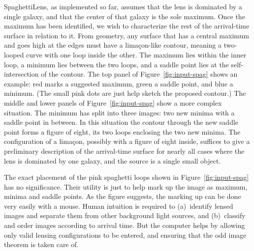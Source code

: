 \documentclass[12pt,preprint]{aastex}
\newcommand{\spl}{SpaghettiLens\xspace}
\newcommand{\figref}[1]{Figure~\ref{fig:#1}}
\newcommand{\Figref}[1]{Figure~\ref{fig:#1}}
\newcommand{\todo}[2][red]{%
\textcolor{#1}{\textbullet}%
\marginpar{\colorbox{#1}{\parbox{\marginparwidth}{%
\setstretch{0.4}\sffamily\textcolor{black}{\scriptsize{#2}}}}}}
\newcommand{\needcite}[1][]{\todo[green]{cit #1}}
\begin{document}
\spl, as implemented so far, assumes that the lens is dominated by a
single galaxy, and that the center of that galaxy is the sole maximum.
Once the maximum has been identified, we wish to characterize the rest
of the arrival-time surface in relation to it.  From geometry, any
surface that has a central maximum and goes high at the edges must
have a lima\c con-like contour, meaning a two-looped curve with one
loop inside the other.  The maximum lies within the inner loop, a
minimum lies between the two loops, and a saddle point lies at the
self-intersection of the contour.  The top panel of
\figref{input-spag} shows an example: red marks a suggested
maximum, green a saddle point, and blue a minimum.  (The small pink
dots are just help sketch the proposed contour.)  The middle and lower
panels of \figref{input-spag} show a more complex situation.
The minimum has split into three images: two new minima with a saddle
point in between.  In this situation the contour through the new
saddle point forms a figure of eight, its two loops enclosing the two
new minima.  The configuration of a lima\c con, possibly with a figure
of eight inside, suffices to give a preliminary description of the
arrival-time surface for nearly all cases where the lens is dominated
by one galaxy, and the source is a single small object.

The exact placement of the pink spaghetti loops shown in
\Figref{input-spag} has no significance.  Their utility is
just to help mark up the image as maximum, minima and saddle points.
As the figure suggests, the marking up can be done very easily with a
mouse.  Human intuition is required to (a)~identify lensed images and
separate them from other background light sources, and (b)~classify
and order images according to arrival time.  But the computer helps by
allowing only valid lensing configurations to be entered, and ensuring
that the odd image theorem\needcite is taken care of.
\end{document}
